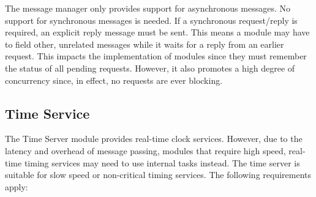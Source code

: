 The message manager only provides support for asynchronous messages. No support for synchronous
messages is needed. If a synchronous request/reply is required, an explicit reply message must
be sent. This means a module may have to field other, unrelated messages while it waits for a
reply from an earlier request. This impacts the implementation of modules since they must
remember the status of all pending requests.  However, it also promotes a high degree of concurrency since, in
effect, no requests are ever blocking.

\subsection{Time Service}
\label{sec:time-service}

The Time Server module provides real-time clock services. However, due to the latency and
overhead of message passing, modules that require high speed, real-time timing services may need
to use internal tasks instead. The time server is suitable for slow speed or non-critical timing
services.  The following requirements apply:

